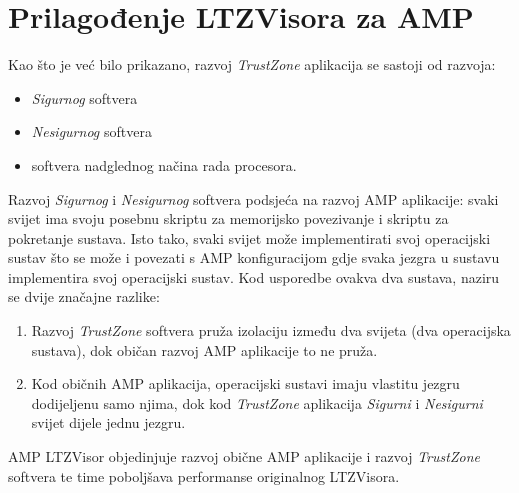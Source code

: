\documentclass[times, utf8, diplomski, numeric]{fer}
\begin{document}
\section{Prilagođenje LTZVisora za AMP}
Kao što je već bilo prikazano, razvoj \textit{TrustZone} aplikacija se sastoji od razvoja:
\begin{itemize}
  \item {\textit{Sigurnog} softvera}
  \item{\textit{Nesigurnog} softvera}
  \item{softvera nadglednog načina rada procesora.}
\end{itemize}
Razvoj \textit{Sigurnog} i \textit{Nesigurnog} softvera podsjeća na razvoj AMP aplikacije: svaki svijet ima svoju posebnu
skriptu za memorijsko povezivanje i skriptu za pokretanje sustava. Isto tako, svaki svijet može implementirati svoj operacijski
sustav što se može i povezati s AMP konfiguracijom gdje svaka jezgra u sustavu implementira svoj operacijski sustav. Kod
usporedbe ovakva dva sustava, naziru se dvije značajne razlike:
\begin{enumerate}
  \item {Razvoj \textit{TrustZone} softvera pruža izolaciju između dva svijeta (dva operacijska sustava), dok običan razvoj
  AMP aplikacije to ne pruža.}
  \item{Kod običnih AMP aplikacija, operacijski sustavi imaju vlastitu jezgru dodijeljenu samo njima, dok kod
  \textit{TrustZone} aplikacija \textit{Sigurni} i \textit{Nesigurni} svijet dijele jednu jezgru.}
\end{enumerate}
AMP LTZVisor objedinjuje razvoj obične AMP aplikacije i razvoj \textit{TrustZone} softvera te time poboljšava performanse
originalnog LTZVisora.
\end{document}
